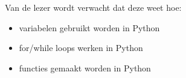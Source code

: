 Van de lezer wordt verwacht dat deze weet hoe:
\begin{itemize}
\item variabelen gebruikt worden in Python
\item for/while loops werken in Python
\item functies gemaakt worden in Python
\end{itemize}


